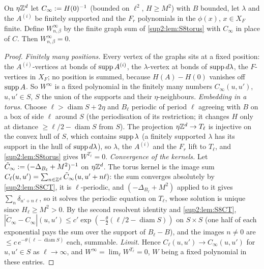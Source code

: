 \begin{lemma}\label{sup2:lem:S8lim}
On $\eta\mathbb Z^d$ let $C_\infty:= H(0)^{-1}$ (bounded on $\ell^2$, $H\ge M^2$) with $B$ bounded, let $\lambda$ and the $A^{(i)}$ be finitely supported and the $F_r$ polynomials in the $\phi(x)$, $x\in X_F$ finite. Define $W^\infty_{n,\beta}$ by the finite graph sum of \cref{sup2:lem:S8torus} with $C_\infty$ in place of $C$. Then $W^\infty_{n,\beta}=0$.
\end{lemma}

\begin{proof}
\emph{Finitely many positions.} Every vertex of the graphs sits at a fixed position: the $A^{(i)}$-vertices at bonds of $\operatorname{supp} A^{(i)}$, the $\lambda$-vertex at bonds of $\operatorname{supp} d\lambda$, the $F$-vertices in $X_F$; no position is summed, because $H(A)-H(0)$ vanishes off $\operatorname{supp} A$. So $W^\infty$ is a fixed polynomial in the finitely many numbers $C_\infty(u,u')$, $u,u'\in S$, $S$ the union of the supports and their $\eta$-neighbours. \emph{Embedding in a torus.} Choose $\ell>\operatorname{diam}S+2\eta$ and $B_\ell$ periodic of period $\ell$ agreeing with $B$ on a box of side $\ell$ around $S$ (the periodisation of its restriction; it changes $H$ only at distance $\ge\ell/2-\operatorname{diam}S$ from $S$). The projection $\eta\mathbb Z^d\to T_\ell$ is injective on the convex hull of $S$, which contains $\operatorname{supp}\lambda$ (a finitely supported $\lambda$ has its support in the hull of $\operatorname{supp} d\lambda$), so $\lambda$, the $A^{(i)}$ and the $F_r$ lift to $T_\ell$, and \cref{sup2:lem:S8torus} gives $W^{T_\ell}=0$. \emph{Convergence of the kernels.} Let $\tilde C_\infty:=(-\Delta_{B_\ell}+M^2)^{-1}$ on $\eta\mathbb Z^d$. The torus kernel is the image sum $C_\ell(u,u')=\sum_{n\in\mathbb Z^d}\tilde C_\infty(u,u'+n\ell)$: the sum converges absolutely by \cref{sup2:lem:S8CT}, it is $\ell$-periodic, and $(-\Delta_{B_\ell}+M^2)$ applied to it gives $\sum_n\delta_{u'+n\ell}$, so it solves the periodic equation on $T_\ell$, whose solution is unique since $H_\ell\ge M^2>0$. By the second resolvent identity and \cref{sup2:lem:S8CT}, $|\tilde C_\infty-C_\infty|(u,u')\le c'\exp(-\frac\theta2(\ell/2-\operatorname{diam}S))$ on $S\times S$ (one half of each exponential pays the sum over the support of $B_\ell-B$), and the images $n\ne0$ are $\le c\,e^{-\theta(\ell-\operatorname{diam}S)}$ each, summable. \emph{Limit.} Hence $C_\ell(u,u')\to C_\infty(u,u')$ for $u,u'\in S$ as $\ell\to\infty$, and $W^\infty=\lim_\ell W^{T_\ell}=0$, $W$ being a fixed polynomial in these entries.
\end{proof}
